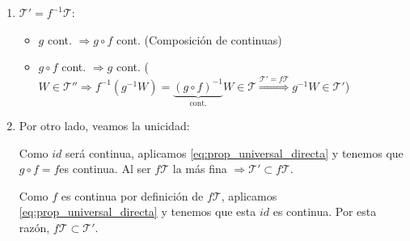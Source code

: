 \begin{demo}
\begin{enumerate}
    \item $\mathcal{T}' = f^{-1}\mathcal{T}: $ 
    \begin{itemize}
        \item $g$ cont. $\Rightarrow g \circ f$ cont. (Composición de continuas)
        \item $g \circ f$ cont. $\Rightarrow g$ cont. ($W \in \mathcal{T}'' \Rightarrow f^{-1}\left( g^{-1} W \right) = \underbrace{\left( g \circ f \right)^{-1}}_{\text{cont.}} W \in \mathcal{T} \stackrel{\mathcal{T}' = f\mathcal{T}}{\Rightarrow} g^{-1}W \in \mathcal{T}'$)
    \end{itemize}

    \item Por otro lado, veamos la unicidad:

    \begin{figure}[H]
        \centering    
    \end{figure}
    Como $id$ será continua, aplicamos \ref{eq:prop_universal_directa} y tenemos que $g \circ f = f$es continua. Al ser $f \mathcal{T}$ la más fina $\Rightarrow \mathcal{T}' \subset f \mathcal{T}$.

    \begin{figure}[H]
        \centering    
    \end{figure}
    Como $f$ es continua por definición de $f \mathcal{T}$, aplicamos \ref{eq:prop_universal_directa} y tenemos que esta $id$ es continua. Por esta razón, $f \mathcal{T} \subset \mathcal{T}'$.
\end{enumerate}
\end{demo}

